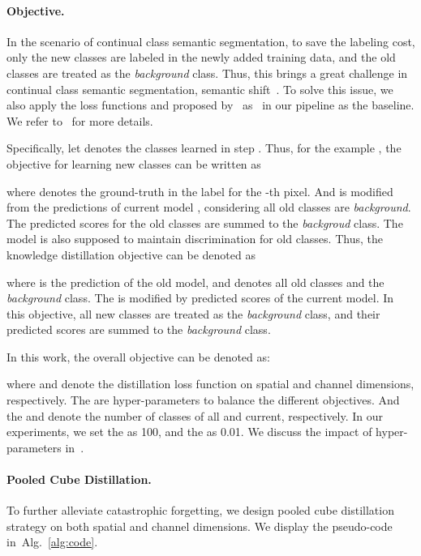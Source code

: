 \documentclass[10pt,twocolumn,letterpaper]{article}
\newcommand{\myPara}[1]{\vspace{-.08in}\paragraph{#1}}
\newcommand{\algref}[1]{Alg.~\ref{#1}}
\begin{document}
\myPara{Objective.}

In the scenario of continual class semantic segmentation,
to save the labeling cost,
only the new classes are labeled in the newly added training data,
and the old classes are treated as the \emph{background} class.
Thus,
this brings a great challenge in continual class semantic segmentation, semantic shift~\cite{mib}.
To solve this issue,
we also apply the loss functions  and  proposed by~\cite{mib} as~\cite{mib,sdr} in our pipeline as the baseline.
We refer to~\cite{mib} for more details.

Specifically,
let  denotes the classes learned in step .
Thus,
for the example ,
the objective for learning new classes can be written as

where  denotes the ground-truth in the label for the -th pixel.
And  is modified from the predictions of current model , considering all old classes are \emph{background}.
The predicted scores for the old classes are summed to the \emph{backgroud} class.
The model is also supposed to maintain discrimination for old classes.
Thus,
the knowledge distillation objective can be denoted as

where  is the prediction of the old model, and  denotes all old classes and the \emph{background} class.
The  is modified by predicted scores  of the current model.
In this objective,
all new classes are treated as the \emph{background} class,
and their predicted scores are summed to the \emph{background} class. 




In this work,
the overall objective can be denoted as:

where  and  denote the distillation loss function on spatial and channel dimensions, respectively.
The  are hyper-parameters to balance the different objectives.
And the  and  denote the number of classes of all and current, respectively.
In our experiments,
we set the  as 100, and the  as 0.01.
We discuss the impact of hyper-parameters in~.

\myPara{Pooled Cube Distillation.}
To further alleviate catastrophic forgetting,
we design pooled cube distillation strategy on both spatial and channel dimensions.
We display the pseudo-code in~\algref{alg:code}.
\end{document}
